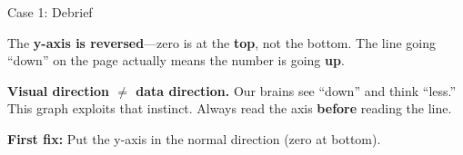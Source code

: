 \documentclass[9pt,english,aspectratio=169]{beamer}
\begin{document}
\begin{frame}{Case 1: Debrief}

  \begin{answerbox}
    The \textbf{y-axis is reversed}---zero is at the \textbf{top}, not the bottom. The line going ``down'' on the page actually means the number is going \textbf{up}.
  \end{answerbox}

  \vspace{0.5em}
  \begin{insightbox}
    \textbf{Visual direction $\neq$ data direction.} Our brains see ``down'' and think ``less.'' This graph exploits that instinct. Always read the axis \textbf{before} reading the line.
  \end{insightbox}

  \vspace{0.5em}
  \textbf{First fix:} Put the y-axis in the normal direction (zero at bottom).

\end{frame}

\end{document}
